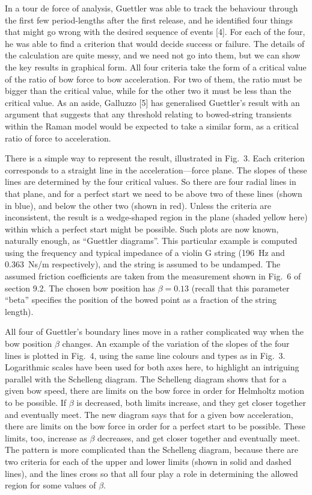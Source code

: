   In a tour de force of analysis, Guettler was able to track the behaviour 
  through the first few period-lengths after the first release, and he 
  identified four things that might go wrong with the desired sequence of 
  events [4]. For each of the four, he was able to find a criterion that would 
  decide success or failure. The details of the calculation are quite messy, 
  and we need not go into them, but we can show the key results in graphical 
  form. All four criteria take the form of a critical value of the ratio of bow 
  force to bow acceleration. For two of them, the ratio must be bigger than the 
  critical value, while for the other two it must be less than the critical 
  value. As an aside, Galluzzo [5] has generalised Guettler's result with an 
  argument that suggests that any threshold relating to bowed-string transients 
  within the Raman model would be expected to take a similar form, as a 
  critical ratio of force to acceleration. 

  There is a simple way to represent the result, illustrated in Fig.\ 3. Each 
  criterion corresponds to a straight line in the acceleration—force plane. The 
  slopes of these lines are determined by the four critical values. So there 
  are four radial lines in that plane, and for a perfect start we need to be 
  above two of these lines (shown in blue), and below the other two (shown in 
  red). Unless the criteria are inconsistent, the result is a wedge-shaped 
  region in the plane (shaded yellow here) within which a perfect start might 
  be possible. Such plots are now known, naturally enough, as ``Guettler 
  diagrams''. This particular example is computed using the frequency and 
  typical impedance of a violin G string (196~Hz and 0.363~Ns/m respectively), 
  and the string is assumed to be undamped. The assumed friction coefficients 
  are taken from the measurement shown in Fig.\ 6 of section 9.2. The chosen 
  bow position has $\beta=0.13$ (recall that this parameter “beta” specifies 
  the position of the bowed point as a fraction of the string length). 

  All four of Guettler's boundary lines move in a rather complicated way when 
  the bow position $\beta$ changes. An example of the variation of the slopes 
  of the four lines is plotted in Fig.\ 4, using the same line colours and 
  types as in Fig.\ 3. Logarithmic scales have been used for both axes here, to 
  highlight an intriguing parallel with the Schelleng diagram. The Schelleng 
  diagram shows that for a given bow speed, there are limits on the bow force 
  in order for Helmholtz motion to be possible. If $\beta$ is decreased, both 
  limits increase, and they get closer together and eventually meet. The new 
  diagram says that for a given bow acceleration, there are limits on the bow 
  force in order for a perfect start to be possible. These limits, too, 
  increase as $\beta$ decreases, and get closer together and eventually meet. 
  The pattern is more complicated than the Schelleng diagram, because there are 
  two criteria for each of the upper and lower limits (shown in solid and 
  dashed lines), and the lines cross so that all four play a role in 
  determining the allowed region for some values of $\beta$. 

